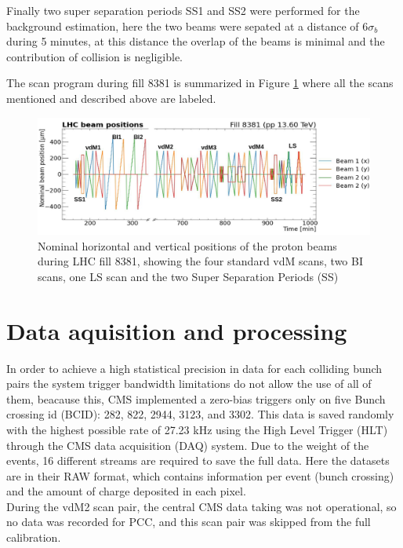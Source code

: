 Finally two super separation periods SS1 and SS2 were performed for the background estimation, here the two beams were sepated at a distance of $6\sigma_{b}$ during 5 minutes, at this distance the overlap of the beams is minimal and the contribution of collision is negligible.

The scan program during fill 8381 is summarized in Figure \ref{scan_prog} where all the scans mentioned and described above are labeled.

\begin{center}
  \begin{figure}[h]	
    \centering
    \includegraphics[scale=.35]{Chapter4/2022Scanprorgam.png}
    \caption[2022 scan program]{Nominal horizontal and vertical positions of the proton beams during LHC fill 8381, showing the four standard vdM scans, two BI scans, one LS scan and the two Super Separation Periods (SS)}
    \label{scan_prog}
  \end{figure}
\end{center}

\section{Data aquisition and processing}
\label{data}
In order to achieve a high statistical precision in data for each colliding bunch pairs the system trigger  bandwidth  limitations do not allow the use of all of them, beacause this, CMS implemented a zero-bias triggers only on five Bunch crossing id (BCID): 282, 822, 2944, 3123, and 3302. This data is saved randomly with the highest possible rate of 27.23 kHz using the High Level Trigger (HLT) through the CMS data acquisition (DAQ) system. Due to the weight of the events, 16 different streams are required to save the full data. Here the datasets are in their RAW format, which contains information per event (bunch crossing) and the amount of charge deposited in each pixel.\\ 
During the vdM2 scan pair, the central CMS data taking was not operational, so no data was recorded for PCC, and this scan pair was skipped from the full calibration.\\

